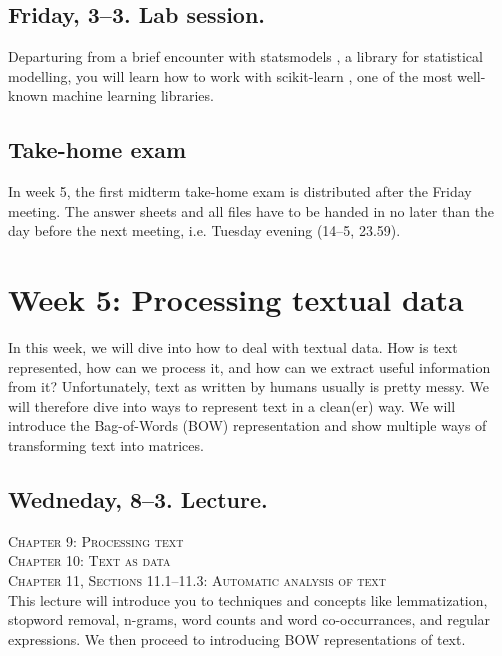 \subsection*{Friday, 3--3. Lab session.}

Departuring from a brief encounter with statsmodels \citep{statsmodels}, a library for statistical modelling, you will learn how to work with scikit-learn \citep{scikit-learn}, one of the most well-known machine learning libraries.

\subsection*{Take-home exam}
In week 5, the first midterm take-home exam is distributed after the Friday meeting. The answer sheets and all files have to be handed in no later than the day before the next meeting, i.e. Tuesday evening (14--5, 23.59).




\section*{Week 5: Processing textual data}
In this week, we will dive into how to deal with textual data. How is text represented, how can we process it, and how can we extract useful information from it?
Unfortunately, text as written by humans usually is pretty messy.  We will therefore dive  into ways to represent text in a clean(er) way. We will introduce the Bag-of-Words (BOW) representation and show multiple ways of transforming text into matrices.


\subsection*{Wedneday, 8--3. Lecture.}
\textsc{ Chapter 9: Processing text}\\
\textsc{ Chapter 10: Text as data}\\
\textsc{ Chapter 11, Sections 11.1--11.3: Automatic analysis of text}\\
  
This lecture will introduce you to techniques and concepts like lemmatization, stopword removal, n-grams, word counts and word co-occurrances, and regular expressions. We then proceed to introducing BOW representations of text.


